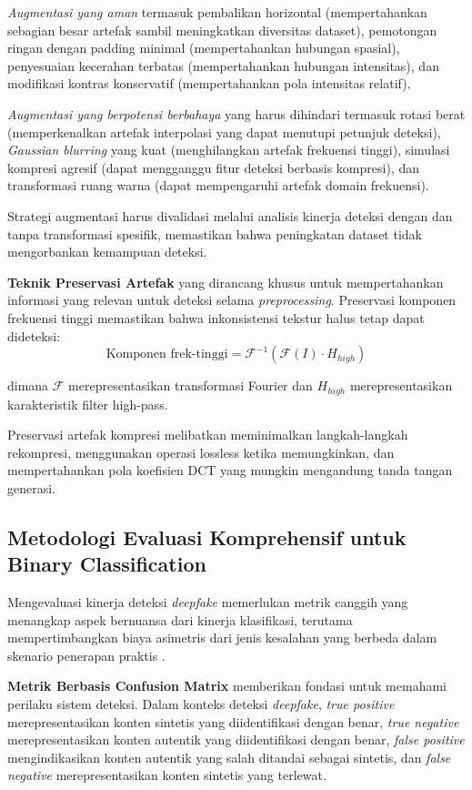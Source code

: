 \textit{Augmentasi yang aman} termasuk pembalikan horizontal (mempertahankan sebagian besar artefak sambil meningkatkan diversitas dataset), pemotongan ringan dengan padding minimal (mempertahankan hubungan spasial), penyesuaian kecerahan terbatas (mempertahankan hubungan intensitas), dan modifikasi kontras konservatif (mempertahankan pola intensitas relatif).

\textit{Augmentasi yang berpotensi berbahaya} yang harus dihindari termasuk rotasi berat (memperkenalkan artefak interpolasi yang dapat menutupi petunjuk deteksi), \textit{Gaussian blurring} yang kuat (menghilangkan artefak frekuensi tinggi), simulasi kompresi agresif (dapat mengganggu fitur deteksi berbasis kompresi), dan transformasi ruang warna (dapat mempengaruhi artefak domain frekuensi).

Strategi augmentasi harus divalidasi melalui analisis kinerja deteksi dengan dan tanpa transformasi spesifik, memastikan bahwa peningkatan dataset tidak mengorbankan kemampuan deteksi.

\textbf{Teknik Preservasi Artefak} yang dirancang khusus untuk mempertahankan informasi yang relevan untuk deteksi selama \textit{preprocessing}. Preservasi komponen frekuensi tinggi memastikan bahwa inkonsistensi tekstur halus tetap dapat dideteksi:
\begin{equation}
\text{Komponen frek-tinggi} = \mathcal{F}^{-1}(\mathcal{F}(I) \cdot H_{high})
\label{eq:high_freq_preservation}
\end{equation}

dimana $\mathcal{F}$ merepresentasikan transformasi Fourier dan $H_{high}$ merepresentasikan karakteristik filter high-pass.

Preservasi artefak kompresi melibatkan meminimalkan langkah-langkah rekompresi, menggunakan operasi lossless ketika memungkinkan, dan mempertahankan pola koefisien DCT yang mungkin mengandung tanda tangan generasi.

\subsection{Metodologi Evaluasi Komprehensif untuk Binary Classification}

Mengevaluasi kinerja deteksi \textit{deepfake} memerlukan metrik canggih yang menangkap aspek bernuansa dari kinerja klasifikasi, terutama mempertimbangkan biaya asimetris dari jenis kesalahan yang berbeda dalam skenario penerapan praktis \cite{hossin2015review}.

\textbf{Metrik Berbasis Confusion Matrix} memberikan fondasi untuk memahami perilaku sistem deteksi. Dalam konteks deteksi \textit{deepfake}, \textit{true positive} merepresentasikan konten sintetis yang diidentifikasi dengan benar, \textit{true negative} merepresentasikan konten autentik yang diidentifikasi dengan benar, \textit{false positive} mengindikasikan konten autentik yang salah ditandai sebagai sintetis, dan \textit{false negative} merepresentasikan konten sintetis yang terlewat.

